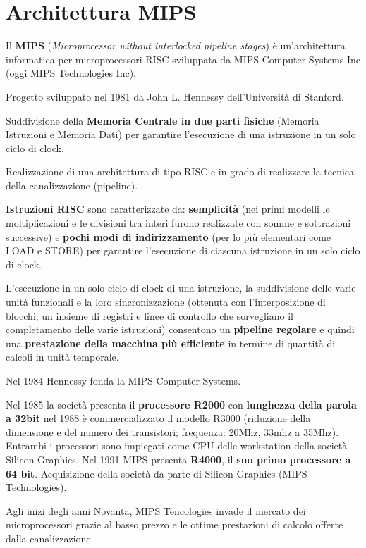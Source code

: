 \documentclass[12pt]{article} %
\begin{document}
\section{Architettura MIPS}
Il \textbf{MIPS} (\textit{Microprocessor without interlocked pipeline stages}) è un’architettura informatica per microprocessori RISC sviluppata da MIPS Computer Systems Inc (oggi MIPS Technologies Inc).\par\medskip\noindent
Progetto sviluppato nel 1981 da John L. Hennessy dell’Università di Stanford.\par\medskip\noindent 
Suddivisione della \textbf{Memoria Centrale in due parti fisiche} (Memoria Istruzioni e Memoria Dati) per garantire l'esecuzione di una istruzione in un solo ciclo di clock. \par\medskip\noindent 
Realizzazione di una architettura di tipo RISC e in grado di realizzare la tecnica della canalizzazione (pipeline).\par\medskip\noindent
\textbf{Istruzioni RISC} sono caratterizzate da: \textbf{semplicità} (nei primi modelli le moltiplicazioni e le divisioni tra interi furono realizzate con somme e sottrazioni successive) e \textbf{pochi modi di indirizzamento} (per lo più elementari come LOAD e STORE) per garantire l’esecuzione di ciascuna istruzione in un solo ciclo di clock. \par\medskip\noindent
L’esecuzione in un solo ciclo di clock di una istruzione, la suddivisione delle varie unità funzionali e la loro sincronizzazione (ottenuta con l'interposizione di blocchi, un insieme di registri e linee di controllo che sorvegliano il completamento delle varie istruzioni) consentono un \textbf{pipeline regolare} e quindi una \textbf{prestazione della macchina più efficiente} in termine di quantità di calcoli in unità temporale.\par\medskip\noindent
Nel 1984 Hennessy fonda la MIPS Computer Systems.\par\medskip\noindent 
Nel 1985 la società presenta il \textbf{processore R2000} con \textbf{lunghezza della parola a 32bit} nel 1988 è commercializzato il modello R3000 (riduzione della dimensione e del numero dei transistori; frequenza: 20Mhz, 33mhz a 35Mhz). Entrambi i processori sono impiegati come CPU delle workstation della società Silicon Graphics.
Nel 1991 MIPS presenta \textbf{R4000}, il \textbf{suo primo processore a 64 bit}. Acquisizione della società da parte di Silicon Graphics (MIPS Technologies).\par\medskip\noindent
Agli inizi degli anni Novanta, MIPS Tencologies invade il mercato dei microprocessori grazie al basso prezzo e le ottime prestazioni di calcolo offerte dalla canalizzazione.\par\medskip\noindent 
\end{document}
